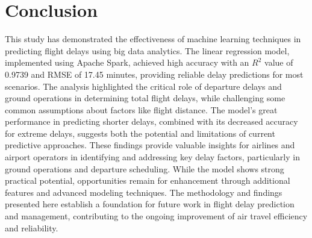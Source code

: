 \section{Conclusion}
This study has demonstrated the effectiveness of machine learning techniques in predicting flight delays using big data analytics. 
The linear regression model, implemented using Apache Spark, achieved high accuracy with an $R^2$ value of 0.9739 and RMSE of 17.45 minutes, providing reliable delay predictions for most scenarios. 
The analysis highlighted the critical role of departure delays and ground operations in determining total flight delays, while challenging some common assumptions about factors like flight distance.
The model's great performance in predicting shorter delays, combined with its decreased accuracy for extreme delays, suggests both the potential and limitations of current predictive approaches. 
These findings provide valuable insights for airlines and airport operators in identifying and addressing key delay factors, particularly in ground operations and departure scheduling.
While the model shows strong practical potential, opportunities remain for enhancement through additional features and advanced modeling techniques. 
The methodology and findings presented here establish a foundation for future work in flight delay prediction and management, contributing to the ongoing improvement of air travel efficiency and reliability.